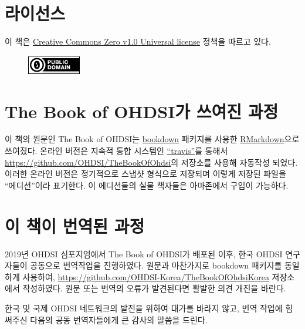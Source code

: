 \documentclass[10.5pt]{book}
\theoremstyle{definition}
\theoremstyle{definition}
\theoremstyle{definition}
\theoremstyle{remark}
\begin{document}
\section*{라이선스}

이 책은
\href{http://creativecommons.org/publicdomain/zero/1.0/}{Creative
Commons Zero v1.0 Universal license} 정책을 따르고 있다.

\begin{figure}
\centering
\includegraphics{images/Preface/cc0.png}
\caption{}
\end{figure}

\section*{The Book of OHDSI가 쓰여진 과정}\label{the-book-of-ohdsi--}

이 책의 원문인 The Book of OHDSI는 \href{https://bookdown.org}{bookdown}
패키지를 사용한 \href{https://rmarkdown.rstudio.com}{RMarkdown}으로
쓰여졌다. 온라인 버전은 지속적 통합 시스템인
\href{http://travis-ci.org/}{``travis''}를 통해서
\url{https://github.com/OHDSI/TheBookOfOhdsi}의 저장소를 사용해 자동작성
되었다. 이러한 온라인 버전은 정기적으로 스냅샷 형식으로 저장되며 이렇게
저장된 파일을 ``에디션''이라 표기한다. 이 에디션들의 실물 책자들은
아마존에서 구입이 가능하다.

\section*{이 책이 번역된 과정}\label{---}

2019년 OHDSI 심포지엄에서 The Book of OHDSI가 배포된 이후, 한국 OHDSI
연구자들이 공동으로 번역작업을 진행하였다. 원문과 마찬가지로 bookdown
패키지를 동일하게 사용하여,
\url{https://github.com/OHDSI-Korea/TheBookOfOhdsiKorea} 저장소에서
작성하였다. 원문 또는 번역의 오류가 발견된다면 활발한 의견 개진을
바란다.

한국 및 국제 OHDSI 네트워크의 발전을 위하여 대가를 바라지 않고, 번역
작업에 힘써주신 다음의 공동 번역자들에게 큰 감사의 말씀을 드린다.
\end{document}
